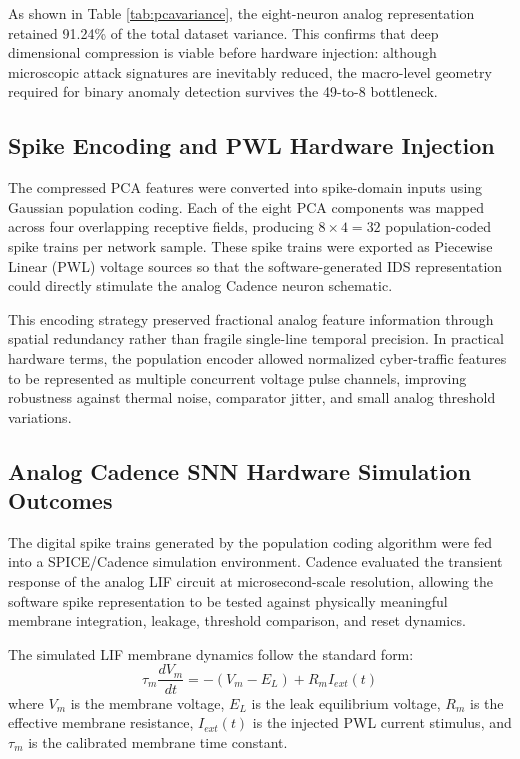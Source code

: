 \documentclass{ieeeaccess}
\begin{document}
As shown in Table \ref{tab:pcavariance}, the eight-neuron analog representation retained 91.24\% of the total dataset variance. This confirms that deep dimensional compression is viable before hardware injection: although microscopic attack signatures are inevitably reduced, the macro-level geometry required for binary anomaly detection survives the 49-to-8 bottleneck.

\subsection{Spike Encoding and PWL Hardware Injection}
The compressed PCA features were converted into spike-domain inputs using Gaussian population coding. Each of the eight PCA components was mapped across four overlapping receptive fields, producing $8 \times 4 = 32$ population-coded spike trains per network sample. These spike trains were exported as Piecewise Linear (PWL) voltage sources so that the software-generated IDS representation could directly stimulate the analog Cadence neuron schematic.

This encoding strategy preserved fractional analog feature information through spatial redundancy rather than fragile single-line temporal precision. In practical hardware terms, the population encoder allowed normalized cyber-traffic features to be represented as multiple concurrent voltage pulse channels, improving robustness against thermal noise, comparator jitter, and small analog threshold variations.

\subsection{Analog Cadence SNN Hardware Simulation Outcomes}
The digital spike trains generated by the population coding algorithm were fed into a SPICE/Cadence simulation environment. Cadence evaluated the transient response of the analog LIF circuit at microsecond-scale resolution, allowing the software spike representation to be tested against physically meaningful membrane integration, leakage, threshold comparison, and reset dynamics.

The simulated LIF membrane dynamics follow the standard form:
\begin{equation}
\tau_m \frac{dV_m}{dt} = -(V_m - E_L) + R_m I_{ext}(t)
\end{equation}
where $V_m$ is the membrane voltage, $E_L$ is the leak equilibrium voltage, $R_m$ is the effective membrane resistance, $I_{ext}(t)$ is the injected PWL current stimulus, and $\tau_m$ is the calibrated membrane time constant.
\end{document}
